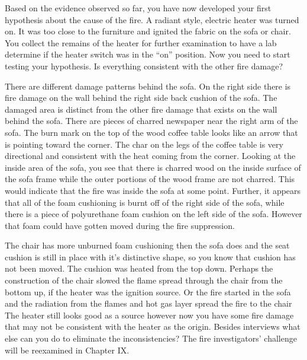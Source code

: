 \documentclass[twoside]{uocthesis}
\begin{document}
{Based on the evidence observed so far, you have now developed your first hypothesis about the cause of the fire.  A radiant style, electric heater was turned on.  It was too close to the furniture and ignited the fabric on the sofa or chair.  You collect the remains of the heater for further examination to have a lab determine if the heater switch was in the ``on'' position.  Now you need to start testing your hypothesis.  Is everything consistent with the other fire damage?  

There are different damage patterns behind the sofa.  On the right side there is fire damage on the wall behind the right side back cushion of the sofa. The damaged area is distinct from the other fire damage that exists on the wall behind the sofa. There are pieces of charred newspaper near the right arm of the sofa.  The burn mark on the top of the wood coffee table looks like an arrow that is pointing toward the corner.  The char on the legs of the coffee table is very directional and consistent with the heat coming from the corner.  Looking at the inside area of the sofa, you see that there is charred wood on the inside surface of the sofa frame while the outer portions of the wood frame are not charred.  This would indicate that the fire was inside the sofa at some point.  Further, it appears that all of the foam cushioning is burnt off of the right side of the sofa, while there is a piece of polyurethane foam cushion on the left side of the sofa.  However that foam could have gotten moved during the fire suppression. 

The chair has more unburned foam cushioning then the sofa does and the seat cushion is still in place with it's distinctive shape, so you know that cushion has not been moved.  The cushion was heated from the top down.  Perhaps the construction of the chair slowed the flame spread through the chair from the bottom up, if the heater was the ignition source.  Or the fire started in the sofa and the radiation from the flames and hot gas layer spread the fire to the chair  The heater still looks good as a source however now you have some fire damage that may not be consistent with the heater as the origin.  Besides interviews what else can you do to eliminate the inconsistencies?   The fire investigators' challenge will be reexamined in Chapter IX.     

}
\end{document}
